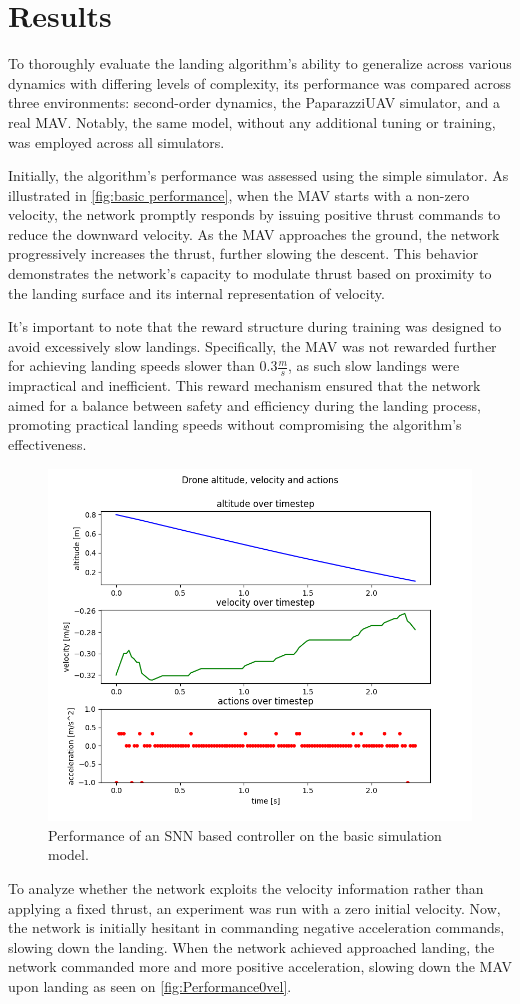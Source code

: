 \section{Results}\label{sec:results}
To thoroughly evaluate the landing algorithm's ability to generalize across various dynamics with differing levels of complexity, its performance was compared across three environments: second-order dynamics, the PaparazziUAV simulator, and a real MAV. Notably, the same model, without any additional tuning or training, was employed across all simulators.

Initially, the algorithm's performance was assessed using the simple simulator. As illustrated in \autoref{fig:basic performance}, when the MAV starts with a non-zero velocity, the network promptly responds by issuing positive thrust commands to reduce the downward velocity. As the MAV approaches the ground, the network progressively increases the thrust, further slowing the descent. This behavior demonstrates the network's capacity to modulate thrust based on proximity to the landing surface and its internal representation of velocity.

It's important to note that the reward structure during training was designed to avoid excessively slow landings. Specifically, the MAV was not rewarded further for achieving landing speeds slower than $0.3 \frac{m}{s}$, as such slow landings were impractical and inefficient. This reward mechanism ensured that the network aimed for a balance between safety and efficiency during the landing process, promoting practical landing speeds without compromising the algorithm's effectiveness.
\begin{figure}[h!]
    \centering
    \includegraphics[width=.45\textwidth]{Figures/drone_landing_seed50_drone_snn_pos_06-05-02.png}
    \caption{Performance of an SNN based controller on the basic simulation model.}
    \label{fig:basic performance}
\end{figure}

To analyze whether the network exploits the velocity information rather than applying a fixed thrust, an experiment was run with a zero initial velocity. Now, the network is initially hesitant in commanding negative acceleration commands, slowing down the landing. When the network achieved approached landing, the network commanded more and more positive acceleration, slowing down the MAV upon landing as seen on \autoref{fig:Performance0vel}.

